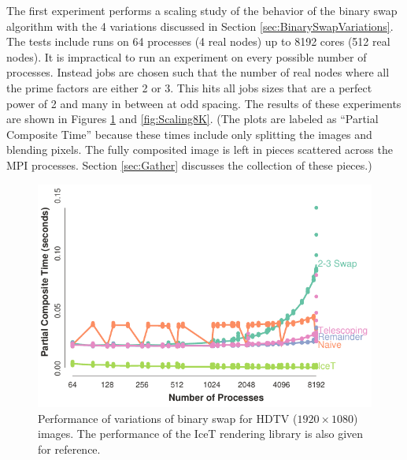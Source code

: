 \documentclass{vgtc}                          %
\newcommand{\textalgorithm}[1]{\textsf{#1}\xspace}
\newcommand{\binaryswap}{\textalgorithm{binary swap}}
\begin{document}
The first experiment performs a scaling study of the behavior of the \binaryswap algorithm with the 4 variations discussed in Section \ref{sec:BinarySwapVariations}.
The tests include runs on 64 processes (4 real nodes) up to 8192 cores (512 real nodes).
It is impractical to run an experiment on every possible number of processes.
Instead jobs are chosen such that the number of real nodes where all the prime factors are either 2 or 3.
This hits all jobs sizes that are a perfect power of 2 and many in between at odd spacing.
The results of these experiments are shown in Figures \ref{fig:ScalingHDTV} and \ref{fig:Scaling8K}.
(The plots are labeled as ``Partial Composite Time'' because these times include only splitting the images and blending pixels.
The fully composited image is left in pieces scattered across the MPI processes.
Section \ref{sec:Gather} discusses the collection of these pieces.)

\begin{figure}
  \centering
  \includegraphics[width=\linewidth]{scaling-hdtv}
  \caption{
    Performance of variations of \binaryswap for HDTV ($1920 \times 1080$) images.
    The performance of the IceT rendering library is also given for reference.
  }
  \label{fig:ScalingHDTV}
\end{figure}
\end{document}
